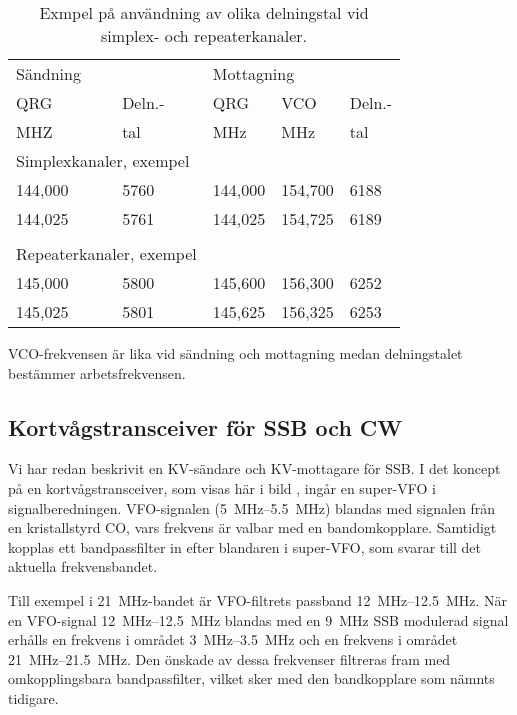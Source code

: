 \begin{table}[ht]
\begin{center}
  \begin{tabular}{ll|lll}
    \multicolumn{2}{l|}{Sändning} &
    \multicolumn{3}{l}{Mottagning} \\
    QRG & Deln.- & QRG & VCO & Deln.- \\
    MHZ & tal    & MHz & MHz & tal \\
    \hline
    \multicolumn{2}{p{7em}|}{Simplexkanaler, exempel} & & & \\
    144,000 & 5760 & 144,000 & 154,700 & 6188 \\
    144,025 & 5761 & 144,025 & 154,725 & 6189 \\
    & & & & \\
    \multicolumn{2}{p{7em}|}{Repeaterkanaler, exempel} & & & \\
    145,000 & 5800 & 145,600 & 156,300 & 6252 \\
    145,025 & 5801 & 145,625 & 156,325 & 6253 \\
  \end{tabular}
\end{center}
\caption{Exmpel på användning av olika delningstal vid simplex- och repeaterkanaler.}
\label{tab:delningstal}
\end{table}

VCO-frekvensen är lika vid sändning och mottagning medan delningstalet
bestämmer arbetsfrekvensen.

\newpage
\subsection{Kortvågstransceiver för SSB och CW}


Vi har redan beskrivit en KV-sändare och KV-mot\-tag\-are för SSB.
I det koncept på en kortvågstransceiver, som visas här i
bild , ingår en super-VFO i signalberedningen.
VFO-signalen (\SIrange{5}{5,5}{\mega\hertz}) blandas med signalen från en
kristallstyrd CO, vars frekvens är valbar med en bandomkopplare.
Samtidigt kopplas ett bandpassfilter in efter blandaren i super-VFO, som svarar
till det aktuella frekvensbandet.

Till exempel i \qty{21}{\mega\hertz}-bandet är VFO-filtrets passband
\SIrange{12}{12,5}{\mega\hertz}.
När en VFO-signal \SIrange{12}{12,5}{\mega\hertz} blandas med en
\qty{9}{\mega\hertz} SSB modulerad signal erhålls en frekvens i området
\SIrange{3}{3,5}{\mega\hertz} och en frekvens i området
\SIrange{21}{21,5}{\mega\hertz}.
Den önskade av dessa frekvenser filtreras fram med omkopplingsbara
bandpassfilter, vilket sker med den bandkopplare som nämnts tidigare.


